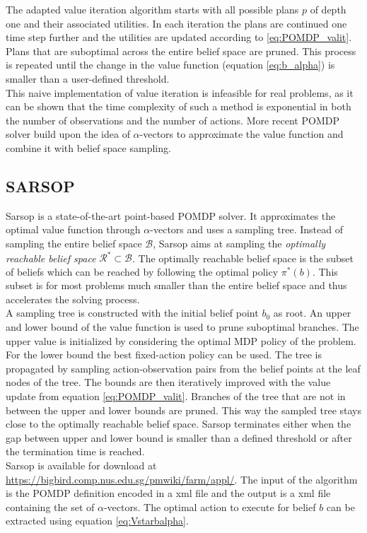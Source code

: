 The adapted value iteration algorithm starts with all possible plans $p$ of depth one and their associated utilities. In each iteration the plans are continued one time step further and the utilities are updated according to \ref{eq:POMDP_valit}. Plans that are suboptimal across the entire belief space are pruned. This process is repeated until the change in the value function (equation \ref{eq:b_alpha}) is smaller than a user-defined threshold.\\

This naive implementation of value iteration is infeasible for real problems, as it can be shown that the time complexity of such a method is exponential in both the number of observations and the number of actions. More recent POMDP solver build upon the idea of $\alpha$-vectors to approximate the value function and combine it with belief space sampling.
\subsection{SARSOP}\label{subsec:SARSOP}
Sarsop \cite{6284837} is a state-of-the-art point-based POMDP solver. It approximates the optimal value function through $\alpha$-vectors and uses a sampling tree. 
Instead of sampling the entire belief space $\mathcal{B}$, Sarsop aims at sampling the \textit{optimally reachable belief space} $\mathcal{R}^* \subset \mathcal{B}$.
The optimally reachable belief space is the subset of beliefs which can be reached by following the optimal policy $\pi^*(b)$. This subset is for most problems much smaller than the entire belief space and thus accelerates the solving process.\\

A sampling tree is constructed with the initial belief point $b_0$ as root. An upper and lower bound of the value function is used to prune suboptimal branches. The upper value is initialized by considering the optimal MDP policy of the problem. For the lower bound the best fixed-action policy can be used. The tree is propagated by sampling action-observation pairs from the belief points at the leaf nodes of the tree. The bounds are then iteratively improved with the value update from equation \ref{eq:POMDP_valit}. Branches of the tree that are not in between the upper and lower bounds are pruned. This way the sampled tree stays close to the optimally reachable belief space. Sarsop terminates either when the gap between upper and lower bound is smaller than a defined threshold or after the termination time is reached.\\

Sarsop is available for download at \url{https://bigbird.comp.nus.edu.sg/pmwiki/farm/appl/}. The input of the algorithm is the POMDP definition encoded in a xml file and the output is a xml file containing the set of $\alpha$-vectors. The optimal action to execute for belief $b$ can be extracted using equation \ref{eq:Vstarbalpha}. 


